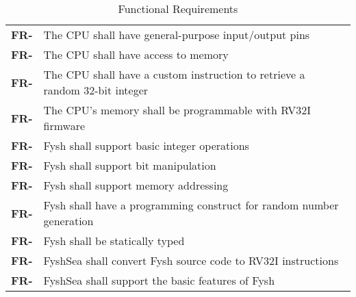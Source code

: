 \resetfyshcounter
\newcommand{\fr}[1]{%
	\textbf{FR-\rc} & #1 \\%
	\hline%
}
\begin{table}[H]
	\begin{tabularx}{\textwidth}{| a | x |}
		\hline
		 &  \\
		\hline
		\fr{The CPU shall have general-purpose input/output pins}
		\fr{The CPU shall have access to memory}
		\fr{The CPU shall have a custom instruction to retrieve a random 32-bit integer}
		\fr{The CPU's memory shall be programmable with RV32I firmware}
		\fr{Fysh shall support basic integer operations}
		\fr{Fysh shall support bit manipulation}
		\fr{Fysh shall support memory addressing}
		\fr{Fysh shall have a programming construct for random number generation}
		\fr{Fysh shall be statically typed}
		\fr{FyshSea shall convert Fysh source code to RV32I instructions}
		\fr{FyshSea shall support the basic features of Fysh}
	\end{tabularx}
	\caption{Functional Requirements}
\end{table}

